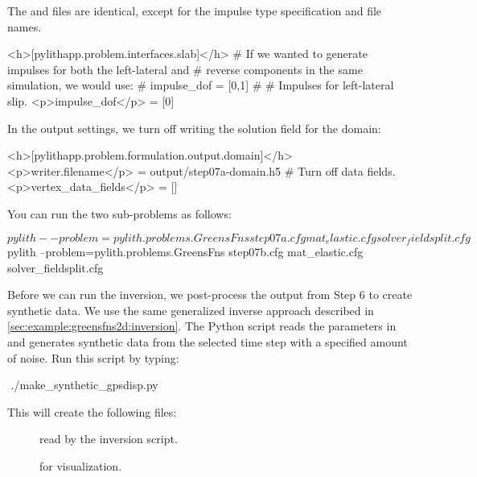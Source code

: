 The  and  files are
identical, except for the impulse type specification and file
names.
\begin{cfg}
<h>[pylithapp.problem.interfaces.slab]</h>
# If we wanted to generate impulses for both the left-lateral and
# reverse components in the same simulation, we would use:
# impulse_dof = [0,1]
#
# Impulses for left-lateral slip.
<p>impulse_dof</p> = [0]
\end{cfg}

In the output settings, we turn off writing the solution field for the
domain:
\begin{cfg}
<h>[pylithapp.problem.formulation.output.domain]</h>
<p>writer.filename</p> = output/step07a-domain.h5
# Turn off data fields.
<p>vertex_data_fields</p> = []
\end{cfg}

You can run the two sub-problems as follows:
\begin{shell}
$$ pylith --problem=pylith.problems.GreensFns step07a.cfg mat_elastic.cfg solver_fieldsplit.cfg
$$ pylith --problem=pylith.problems.GreensFns step07b.cfg mat_elastic.cfg solver_fieldsplit.cfg
\end{shell}


Before we can run the inversion, we post-process the output from Step
6 to create synthetic data. We use the same generalized inverse
approach described in \vref{sec:example:greensfns2d:inversion}. The
Python script  reads the
parameters in  and generates
synthetic data from the selected time step with a specified amount of
noise. Run this script by typing:
\begin{shell}
$$ ./make_synthetic_gpsdisp.py
\end{shell}
This will create the following files:
\begin{description}
\item[] read by the
  inversion script.
\item[] for visualization.
\end{description}

